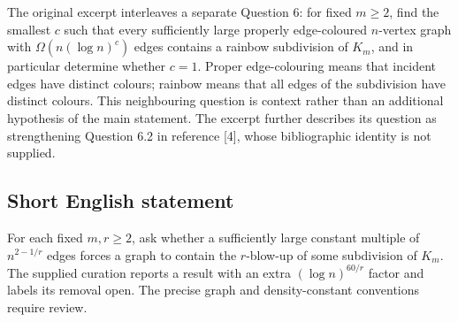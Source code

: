 \documentclass[11pt]{article}
\begin{document}
The original excerpt interleaves a separate Question 6: for fixed \(m\geq2\), find the smallest \(c\) such that every sufficiently large properly edge-coloured \(n\)-vertex graph with \(\Omega(n(\log n)^c)\) edges contains a rainbow subdivision of \(K_m\), and in particular determine whether \(c=1\). Proper edge-colouring means that incident edges have distinct colours; rainbow means that all edges of the subdivision have distinct colours. This neighbouring question is context rather than an additional hypothesis of the main statement. The excerpt further describes its question as strengthening Question 6.2 in reference [4], whose bibliographic identity is not supplied.
\subsection{Short English statement}
For each fixed \(m,r\geq2\), ask whether a sufficiently large constant multiple of \(n^{2-1/r}\) edges forces a graph to contain the \(r\)-blow-up of some subdivision of \(K_m\). The supplied curation reports a result with an extra \((\log n)^{60/r}\) factor and labels its removal open. The precise graph and density-constant conventions require review.
\end{document}
